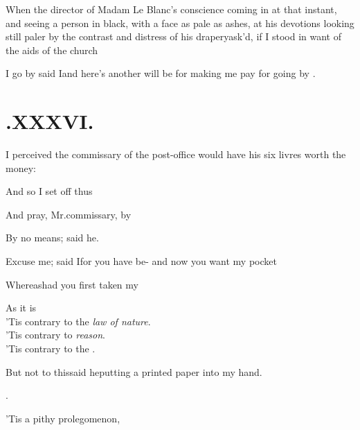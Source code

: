 \documentclass[twoside]{article}
\begin{document}
When the director of Madam Le Blanc’s conscience
coming in at that instant, and seeing a person in black, with a
face as pale as ashes, at his devotions\break
\tsk looking still paler by the contrast and distress of his
drapery\tsk ask’d, if I stood in want of the aids of the
church\tsh

I go by \tsk said I\tsk and here’s
another will be for making me pay for going by
.

\section{.\enspace XXXVI.}

 I perceived the commissary of the\break
post-office would have his six livres\break
{}
worth the money:

And so I set off thus\tsh{}

\tsh And pray, Mr.\@ commissary, by\break
{}

By no means; said he.\etpp

Excuse me; said I\tsk for you have be-\break
{}
\tsk and now you want my pocket\tsh

Whereas\tsk had you first taken my\break
{}

As it is\tsh\\
\tsh ’Tis contrary to the \textit{law of nature}.\\
\tsh ’Tis contrary to \textit{reason}.\\
\tsh ’Tis contrary to the .

But not to this\tsh said he\tsk putting a\break
printed paper into my hand.\\
\centerline{.}
\newpage
\tsh\tsh ’Tis a pithy prolegomenon,
\break
\stick{\tsk \tsk \tsk \tsk \tsk \tsk \tsk \tsk \tsk \tsk \tsk \tsk}
\stick{\tsk \tsk \tsk \tsk \tsk \tsk \tsk \tsk \tsk \tsk \tsk \tsk}
\stick{\tsk \tsk \tsk \tsk \tsk \tsk \tsk \tsk \tsk \tsk \tsk \tsk}
\stick{\tsk \tsk \tsk \tsk \tsk \tsk \tsk \tsk \tsk \tsk \tsk \tsk}
\end{document}
